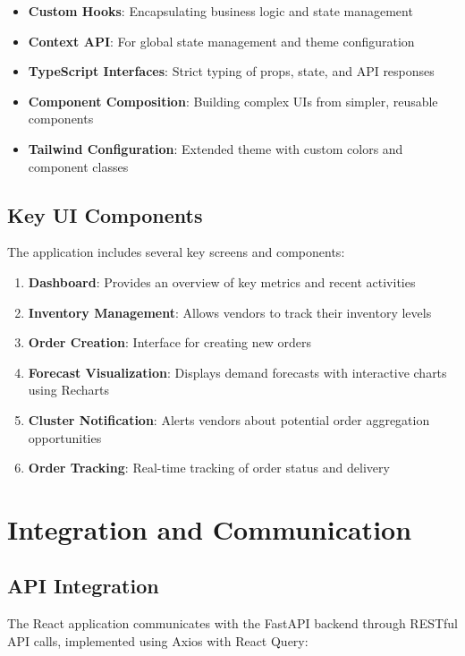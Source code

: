 \begin{itemize}
    \item \textbf{Custom Hooks}: Encapsulating business logic and state management
    \item \textbf{Context API}: For global state management and theme configuration
    \item \textbf{TypeScript Interfaces}: Strict typing of props, state, and API responses
    \item \textbf{Component Composition}: Building complex UIs from simpler, reusable components
    \item \textbf{Tailwind Configuration}: Extended theme with custom colors and component classes
\end{itemize}

\subsection{Key UI Components}

The application includes several key screens and components:

\begin{enumerate}
    \item \textbf{Dashboard}: Provides an overview of key metrics and recent activities
    \item \textbf{Inventory Management}: Allows vendors to track their inventory levels
    \item \textbf{Order Creation}: Interface for creating new orders
    \item \textbf{Forecast Visualization}: Displays demand forecasts with interactive charts using Recharts
    \item \textbf{Cluster Notification}: Alerts vendors about potential order aggregation opportunities
    \item \textbf{Order Tracking}: Real-time tracking of order status and delivery
\end{enumerate}

\section{Integration and Communication}

\subsection{API Integration}

The React application communicates with the FastAPI backend through RESTful API calls, implemented using Axios with React Query:

